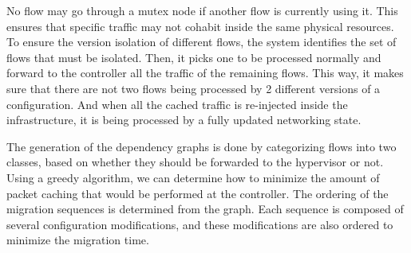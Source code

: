 No flow may go through a mutex node if another flow is currently using it.
This ensures that specific traffic may not cohabit inside the same physical resources.
To ensure the version isolation of different flows, the system identifies the set of flows that must be isolated. Then, it picks one to be processed normally and forward to the controller all the traffic of the remaining flows. This way, it makes sure that there are not two flows being processed by 2 different versions of a configuration. And when all the cached traffic is re-injected inside the infrastructure, it is being processed by a fully updated networking state.

The generation of the dependency graphs is done by categorizing flows into two classes, based on whether they should be forwarded to the hypervisor or not. Using a greedy algorithm, we can determine how to minimize the amount of packet caching that would be performed at the controller.
The ordering of the migration sequences is determined from the graph. Each sequence is composed of several configuration modifications, and these modifications are also ordered to minimize the migration time. 

